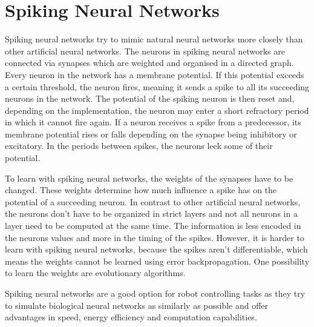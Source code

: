 \section{Spiking Neural Networks}
\label{sec:spiking}
Spiking neural networks try to mimic natural neural networks more closely than other artificial neural networks.
The neurons in spiking neural networks are connected via synapses which are weighted and organised in a directed graph.
Every neuron in the network has a membrane potential.
If this potential exceeds a certain threshold, the neuron fires, meaning it sends a spike to all its succeeding neurons in the network.
The potential of the spiking neuron is then reset and, depending on the implementation, the neuron may enter a short refractory period in which it cannot fire again.
If a neuron receives a spike from a predecessor, its membrane potential rises or falls depending on the synapse being inhibitory or excitatory.
In the periods between spikes, the neurons leek some of their potential\cite{b1}.

To learn with spiking neural networks, the weights of the synapses have to be changed.
These weights determine how much influence a spike has on the potential of a succeeding neuron.
In contrast to other artificial neural networks, the neurons don't have to be organized in strict layers and not all neurons in a layer need to be computed at the same time.
The information is less encoded in the neurons values and more in the timing of the spikes\cite{b2}.
However, it is harder to learn with spiking neural networks, because the spikes aren't differentiable, which means the weights cannot be learned using error backpropagation.
One possibility to learn the weights are evolutionary algorithms.

Spiking neural networks are a good option for robot controlling tasks as they try to simulate biological neural networks as similarly as possible and offer advantages in speed, energy efficiency and computation capabilities\cite{b3}.
